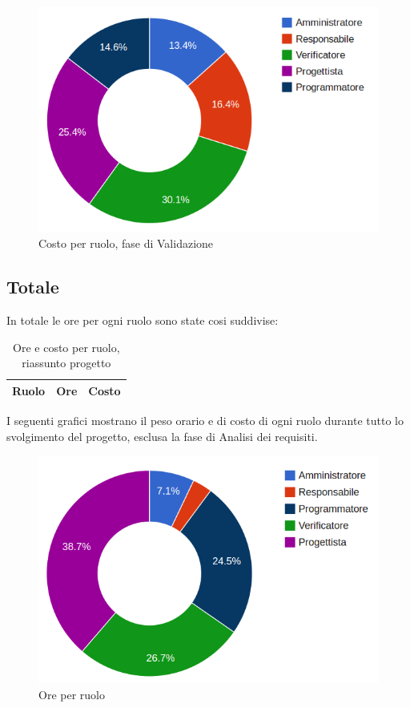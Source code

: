 \begin{figure}[H]
\centering
\includegraphics[scale=0.35]{5-4-2.png}
\caption{Costo per ruolo, fase di Validazione\label{fig:nome}}
\end{figure}

\subsection{Totale}

In totale le ore per ogni ruolo sono state cosi suddivise:

\begin{table}[H]
	\centering
	\begin{tabular}{ l c c }
	\textbf{Ruolo} & \textbf{Ore} & \textbf{Costo} \\
	\hline
	
		
	
	\end{tabular}
	\caption{Ore e costo per ruolo, riassunto progetto}
	\end{table}

I seguenti grafici mostrano il peso orario e di costo di ogni ruolo durante tutto lo svolgimento del progetto, esclusa la fase di Analisi dei requisiti.

\begin{figure}[H]
\centering
\includegraphics[scale=0.35]{5-5-1.png}
\caption{Ore per ruolo\label{fig:nome}}
\end{figure}

